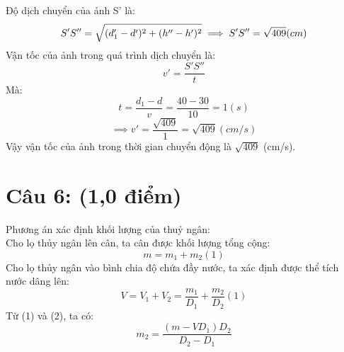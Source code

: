 \documentclass[15pt]{article}
\begin{document}
Độ dịch chuyển của ảnh S' là:\\
\begin{equation*}
    S'S'' = \sqrt{(d_{1}' - d')^2 + (h'' - h')^2}\\
    \implies S'S'' = \sqrt{409} (cm)\\
\end{equation*}
Vận tốc của ảnh trong quá trình dịch chuyển là:\\
\begin{equation*}
    v' = \frac{S'S''}{t}
\end{equation*}
Mà:
\begin{equation*}
    t = \frac{d_{1} - d}{v} = \frac{40 - 30}{10} = 1 (s)
\end{equation*}
\begin{equation*}
    \implies v' = \frac{\sqrt{409}}{1} = \sqrt{409} (cm/s)
\end{equation*}
Vậy vận tốc của ảnh trong thời gian chuyển động là $\sqrt{409}$ (cm/s).
\section*{Câu 6: (1,0 điểm)}
Phương án xác định khối lượng của thuỷ ngân:\\
Cho lọ thủy ngân lên cân, ta cân được khối lượng tổng cộng:
\begin{equation*}
    m = m_{1} + m_{2} (1)
\end{equation*}
Cho lọ thủy ngân vào bình chia độ chứa đầy nước, ta xác định được thể tích nước dâng lên:
\begin{equation*}
    V = V_{1} + V_{2} = \frac{m_{1}}{D_{1}} + \frac{m_{2}}{D_{2}} (1)
\end{equation*}
Từ (1) và (2), ta có:\\
\begin{equation*}
    m_{2} = \frac{(m - VD_{1})D_{2}}{D_{2} - D_{1}}
\end{equation*}
\end{document}
